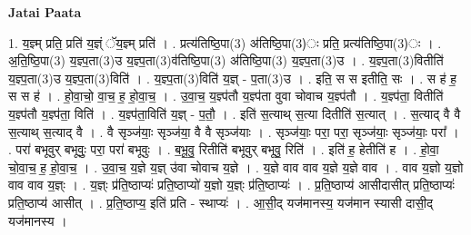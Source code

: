 \documentclass[17pt]{extarticle}
\begin{document}
\textbf{Jatai Paata} \newline

1. य॒ज्ञ्म् प्रति॒ प्रति॑ य॒ज्ञ्ं ॅय॒ज्ञ्म् प्रति॑ । . प्रत्य॑तिष्ठि॒पा(3) अ॑तिष्ठि॒पा(3)ः प्रति॒ प्रत्य॑तिष्ठि॒पा(3)ः । . अ॒ति॒ष्ठि॒पा(3) य॒ज्ञ्प॒ता(3)‌उ य॒ज्ञ्प॒ता(3)‌व॑तिष्ठि॒पा(3) अ॑तिष्ठि॒पा(3) य॒ज्ञ्प॒ता(3)‌उ । . य॒ज्ञ्प॒ता(3)‌वितीति॑ य॒ज्ञ्प॒ता(3)‌उ य॒ज्ञ्प॒ता(3)‌विति॑ । . य॒ज्ञ्प॒ता(3)विति॑ य॒ज्ञ् - प॒ता(3)उ । . इति॒ स स इतीति॒ सः । . स ह॑ ह॒ स स ह॑ । . हो॒वा॒चो॒ वा॒च॒ ह॒ हो॒वा॒च॒ । . उ॒वा॒च॒ य॒ज्ञ्प॑तौ य॒ज्ञ्प॑ता वुवा चोवाच य॒ज्ञ्प॑तौ । . य॒ज्ञ्प॑ता॒ वितीति॑ य॒ज्ञ्प॑तौ य॒ज्ञ्प॑ता॒ विति॑ । . य॒ज्ञ्प॑ता॒विति॑ य॒ज्ञ् - प॒तौ॒ । . इति॑ स॒त्याथ् स॒त्या दितीति॑ स॒त्यात् । . स॒त्याद् वै वै स॒त्याथ् स॒त्याद् वै । . वै सृञ्ज॑याः॒ सृञ्ज॑या॒ वै वै सृञ्ज॑याः । . सृञ्ज॑याः॒ परा॒ परा॒ सृञ्ज॑याः॒ सृञ्ज॑याः॒ परा᳚ । . परा॑ बभूवुर् बभूवुः॒ परा॒ परा॑ बभूवुः । . ब॒भू॒वु॒ रितीति॑ बभूवुर् बभूवु॒ रिति॑ । . इति॑ ह॒ हेतीति॑ ह । . हो॒वा॒ चो॒वा॒च॒ ह॒ हो॒वा॒च॒ । . उ॒वा॒च॒ य॒ज्ञे य॒ज्ञ् उ॑वा चोवाच य॒ज्ञे । . य॒ज्ञे वाव वाव य॒ज्ञे य॒ज्ञे वाव । . वाव य॒ज्ञो य॒ज्ञो वाव वाव य॒ज्ञ्ः । . य॒ज्ञ्ः प्र॑ति॒ष्ठाप्यः॑ प्रति॒ष्ठाप्यो॑ य॒ज्ञो य॒ज्ञ्ः प्र॑ति॒ष्ठाप्यः॑ । . प्र॒ति॒ष्ठाप्य॑ आसीदासीत् प्रति॒ष्ठाप्यः॑ प्रति॒ष्ठाप्य॑ आसीत् । . प्र॒ति॒ष्ठाप्य॒ इति॑ प्रति - स्थाप्यः॑ । . आ॒सी॒द् यज॑मानस्य॒ यज॑मान स्यासी दासी॒द् यज॑मानस्य । \newline
\end{document}
